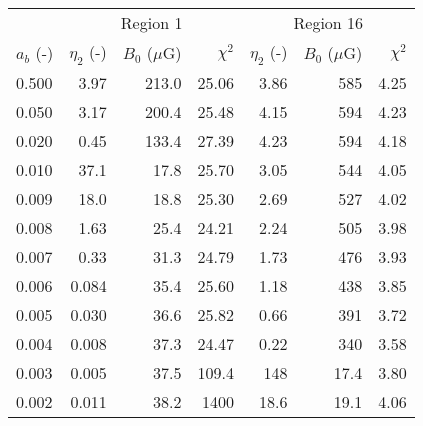 \begin{tabular}{@{}lrrrrrr@{}}
\toprule
{} & \multicolumn{3}{c}{Region 1} & \multicolumn{3}{c}{Region 16}\\
\cmidrule(lr){2-4} \cmidrule(l){5-7}
$a_b$ (-) & $\eta_2$ (-) & $B_0$ ($\mu$G) & $\chi^2$
          & $\eta_2$ (-) & $B_0$ ($\mu$G) & $\chi^2$ \\
\midrule
0.500 & 3.97  & 213.0 & 25.06 & 3.86 & 585  & 4.25 \\
0.050 & 3.17  & 200.4 & 25.48 & 4.15 & 594  & 4.23 \\
0.020 & 0.45  & 133.4 & 27.39 & 4.23 & 594  & 4.18 \\
0.010 & 37.1  &  17.8 & 25.70 & 3.05 & 544  & 4.05 \\
0.009 & 18.0  &  18.8 & 25.30 & 2.69 & 527  & 4.02 \\
0.008 & 1.63  &  25.4 & 24.21 & 2.24 & 505  & 3.98 \\
0.007 & 0.33  &  31.3 & 24.79 & 1.73 & 476  & 3.93 \\
0.006 & 0.084 &  35.4 & 25.60 & 1.18 & 438  & 3.85 \\
0.005 & 0.030 &  36.6 & 25.82 & 0.66 & 391  & 3.72 \\
0.004 & 0.008 &  37.3 & 24.47 & 0.22 & 340  & 3.58 \\
0.003 & 0.005 &  37.5 & 109.4 &  148 & 17.4 & 3.80 \\
0.002 & 0.011 &  38.2 & 1400  & 18.6 & 19.1 & 4.06 \\
\bottomrule
\end{tabular}
